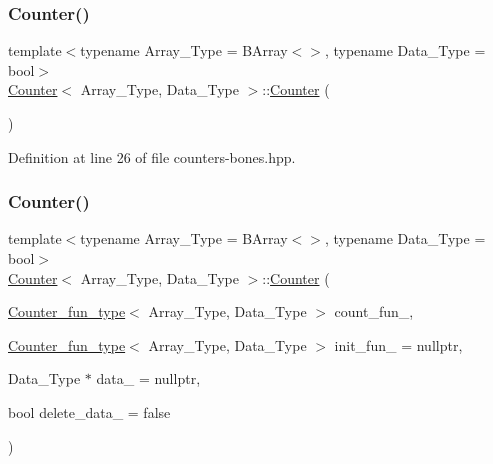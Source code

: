 \subsubsection{\texorpdfstring{Counter()}{Counter()}\hspace{0.1cm}{\footnotesize\ttfamily [1/2]}}
{\footnotesize\ttfamily template$<$typename Array\+\_\+\+Type = B\+Array$<$$>$, typename Data\+\_\+\+Type = bool$>$ \\
\hyperlink{class_counter}{Counter}$<$ Array\+\_\+\+Type, Data\+\_\+\+Type $>$\+::\hyperlink{class_counter}{Counter} (\begin{DoxyParamCaption}{ }\end{DoxyParamCaption})\hspace{0.3cm}{\ttfamily [inline]}}



Definition at line 26 of file counters-\/bones.\+hpp.

\mbox{\label{class_counter_ad2a63c2b9b6c593d292dfd47e2f7a780}} 
\subsubsection{\texorpdfstring{Counter()}{Counter()}\hspace{0.1cm}{\footnotesize\ttfamily [2/2]}}
{\footnotesize\ttfamily template$<$typename Array\+\_\+\+Type = B\+Array$<$$>$, typename Data\+\_\+\+Type = bool$>$ \\
\hyperlink{class_counter}{Counter}$<$ Array\+\_\+\+Type, Data\+\_\+\+Type $>$\+::\hyperlink{class_counter}{Counter} (\begin{DoxyParamCaption}\item[{\hyperlink{typedefs_8hpp_ac0160f52f564dea3ac033b374cffbfe7}{Counter\+\_\+fun\+\_\+type}$<$ Array\+\_\+\+Type, Data\+\_\+\+Type $>$}]{count\+\_\+fun\+\_\+,  }\item[{\hyperlink{typedefs_8hpp_ac0160f52f564dea3ac033b374cffbfe7}{Counter\+\_\+fun\+\_\+type}$<$ Array\+\_\+\+Type, Data\+\_\+\+Type $>$}]{init\+\_\+fun\+\_\+ = {\ttfamily nullptr},  }\item[{Data\+\_\+\+Type $\ast$}]{data\+\_\+ = {\ttfamily nullptr},  }\item[{bool}]{delete\+\_\+data\+\_\+ = {\ttfamily false} }\end{DoxyParamCaption})\hspace{0.3cm}{\ttfamily [inline]}}



